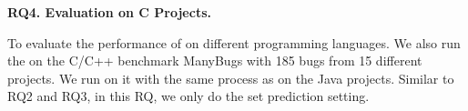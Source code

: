 {\bf RQ4. Evaluation on C Projects.}

To evaluate the performance of \tool on different programming languages. We also run the \tool on the C/C++ benchmark ManyBugs \cite{manybugs} with 185 bugs from 15 different projects. We run \tool on it with the same process as on the Java projects. Similar to RQ2 and RQ3, in this RQ, we only do the set prediction setting.
